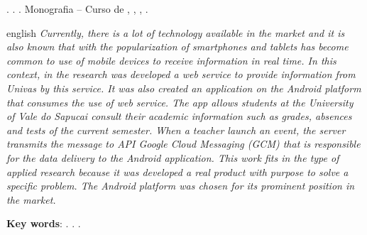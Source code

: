 
\begin{OnehalfSpacing} 

\noindent \imprimirAutorCitacaoMaiuscula. {\bfseries\imprimirtitulo}.
 {\imprimirdata}.  Monografia -- Curso de {\MakeUppercase\imprimircurso},
 {\imprimirinstituicao}, {\imprimirlocal}, {\imprimirdata}.

\vspace{\onelineskip}
\vspace{\onelineskip}
\vspace{\onelineskip}
\vspace{\onelineskip}

\begin{resumo}[Abstract]%
\begin{otherlanguage*}{english}%
\textit{
\noindent Currently, there is a lot of technology available in the market and it
is also known that with the popularization of smartphones and tablets has
become common to use of mobile devices to receive information in real time. In
this context, in the research was developed a web service to provide
information from Univas by this service. It was also created an application on
the Android platform that consumes the use of web service. The app allows
students at the University of Vale do Sapucai  consult their academic
information such as grades, absences and tests of the current semester. When a
teacher launch an event, the server transmits the message to API Google Cloud
Messaging (GCM) that is responsible for the data delivery to the Android
application. This work  fits in the type of applied research because it was
developed a real product with purpose to solve a specific problem. The Android
platform was chosen for its  prominent position in the market.
}

\vspace{\onelineskip}
\vspace*{\fill}
\noindent \textbf{Key words}: \imprimirKeyWordOne. \imprimirKeyWordTwo. \imprimirKeyWordThree.
\end{otherlanguage*}
\vspace{\onelineskip}
\end{resumo}

\end{OnehalfSpacing}
